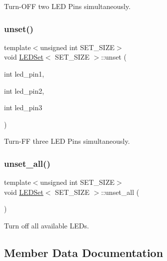 Turn-\/\+O\+FF two L\+ED Pins simultaneously. 

\mbox{\label{classLEDSet_a1a6a52e4fd96dd8500861df0a9d0066d}} 
\subsubsection{\texorpdfstring{unset()}{unset()}\hspace{0.1cm}{\footnotesize\ttfamily [3/3]}}
{\footnotesize\ttfamily template$<$unsigned int S\+E\+T\+\_\+\+S\+I\+ZE$>$ \\
void \hyperlink{classLEDSet}{L\+E\+D\+Set}$<$ S\+E\+T\+\_\+\+S\+I\+ZE $>$\+::unset (\begin{DoxyParamCaption}\item[{int}]{led\+\_\+pin1,  }\item[{int}]{led\+\_\+pin2,  }\item[{int}]{led\+\_\+pin3 }\end{DoxyParamCaption})\hspace{0.3cm}{\ttfamily [inline]}}



Turn-\/\+FF three L\+ED Pins simultaneously. 

\mbox{\label{classLEDSet_aabff2609d8df733936dda53d60302b72}} 
\subsubsection{\texorpdfstring{unset\+\_\+all()}{unset\_all()}}
{\footnotesize\ttfamily template$<$unsigned int S\+E\+T\+\_\+\+S\+I\+ZE$>$ \\
void \hyperlink{classLEDSet}{L\+E\+D\+Set}$<$ S\+E\+T\+\_\+\+S\+I\+ZE $>$\+::unset\+\_\+all (\begin{DoxyParamCaption}{ }\end{DoxyParamCaption})\hspace{0.3cm}{\ttfamily [inline]}}

Turn off all available L\+E\+Ds. 

\subsection{Member Data Documentation}
\mbox{\label{classLEDSet_af9c6ea1d0006d7427c82e8e56f9f2de5}} 
